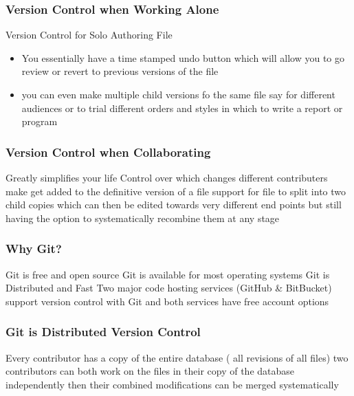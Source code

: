 \documentclass[xcolor=dvipsnames]{beamer}
\begin{document}
\begin{frame}
\frametitle{Version Control when Working Alone}
\begin{block}{Version Control for Solo Authoring File}
\begin{itemize}
\item You essentially have a time stamped undo button which will allow you to go review or revert to previous versions of the file
\item you can even make multiple child versions fo the same file say for different audiences or to trial different orders and styles in which to write a report or program
\end{itemize}
\end{block}

\end{frame}


\begin{frame}
\frametitle{Version Control when Collaborating}
Greatly simplifies your life
Control over which changes different contributers make get added to the definitive version of a file
support for file to split into two child copies which can then be edited towards very different end points but still having the option to systematically recombine them at any stage

\end{frame}

\begin{frame}
\frametitle{Why Git?}

Git is free and open source
\newline
\newline
Git is available for most operating systems
\newline
\newline
Git is Distributed and Fast
\newline
\newline
Two major code hosting services (GitHub \& BitBucket) support version control with Git and both services have free account options
\end{frame}

\begin{frame} 
\frametitle{Git is Distributed Version Control}
Every contributor has a copy of the entire database ( all revisions of all files)
two contributors can both work on the files in their copy of the database independently then their combined modifications can be merged systematically
\end{frame} 
\end{document}
